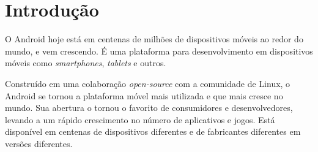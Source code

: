 \documentclass[a4paper,12pt,brazil,oneside]{book}
\begin{document}
\clearpage %

\singlespace

\lstset{language=[Objective]C}

\listoffigures
\clearpage
{}

\thispagestyle{empty}

\listoftables
\clearpage
{}

\thispagestyle{empty}

\listoflistings
\clearpage
\thispagestyle{empty}


\doublespace
\chapter{Introdução}

O Android hoje está em centenas de milhões de dispositivos móveis ao redor do mundo, e vem crescendo. É uma plataforma para desenvolvimento em dispositivos móveis como \emph{smartphones}, \emph{tablets} e outros. 

Construído em uma colaboração \emph{open-source} com a comunidade de Linux, o Android se tornou a plataforma móvel mais utilizada e que mais cresce no mundo. Sua abertura o tornou o favorito de consumidores e desenvolvedores, levando a um rápido crescimento no número de aplicativos e jogos. Está disponível em centenas de dispositivos diferentes e de fabricantes diferentes em versões diferentes.
\end{document}

